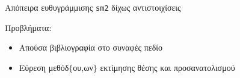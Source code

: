 \begin{frame}{Απόπειρα ευθυγράμμισης \texttt{sm2} δίχως αντιστοιχίσεις}

  Προβλήματα:

  \begin{itemize}
    \item Απούσα βιβλιογραφία στο συναφές πεδίο
    \item Εύρεση μεθόδ$\{$ου,ων$\}$ εκτίμησης θέσης και προσανατολισμού
  \end{itemize}

\end{frame}
